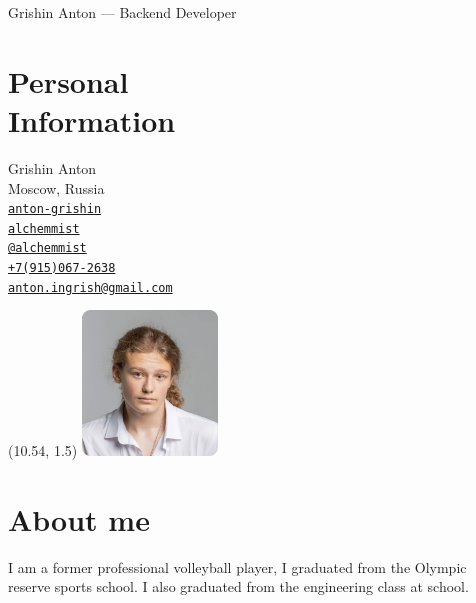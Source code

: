 \documentclass[margin,line]{resume}
\begin{document}
{\sc \large Grishin Anton --- Backend Developer} \\
\begin{resume}
  \begin{minipage}[t]{0.55\textwidth}
    \section{\mysidestyle Personal\\Information}
    Grishin Anton \\
    Moscow, Russia \\
    \faLinkedin \space
    \href{https://www.linkedin.com/in/anton-grishin-6966a8362/}{\texttt{anton-grishin}}
    \\
    \faGithub  \space
    \href{https://github.com/alchemmist/}{\texttt{alchemmist}} \\
    \faPaperPlane \space \href{https://t.me/alchemmist}{\texttt{@alchemmist}} \\
    \faPhone \space
    \href{tel:+1234567890}{\color{blue}\texttt{+7(915)067-2638}}  \\
    \faEnvelope \space
    \href{mailto:anton.ingrish@gmail.com}{\color{blue}\texttt{anton.ingrish@gmail.com}}
  \end{minipage}
  \begin{minipage}[H]{0.18\textwidth}
    \begin{textblock}{7}(10.54, 1.5)
      \includegraphics[width=0.27\textwidth]{images/avatar.png}
    \end{textblock}
  \end{minipage}
  \section{\mysidestyle About me}
  I am a former professional volleyball player, I graduated from the
  Olympic reserve sports school. I also graduated from the
  engineering class at school.


\end{resume}
\end{document}
